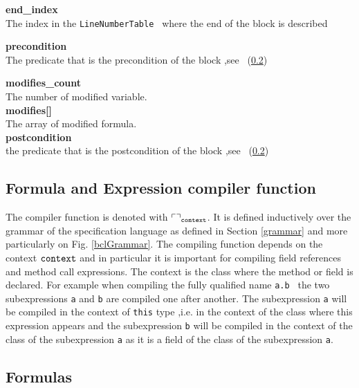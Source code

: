 \begin{appendix}
\textbf{end\_index} \\
   The index in the  \texttt{LineNumberTable } where the end of the block  is described

\textbf{  precondition} \\
  The predicate that is the precondition of the block ,see  ~(\ref{formula})

\textbf{   modifies\_count} \\
   The number of modified variable.\\

\textbf{   modifies[]} \\
   The array of modified formula.\\

\textbf{  postcondition} \\
  the predicate that is the postcondition of the block ,see  ~(\ref{formula})

\subsection{Formula and Expression compiler function }
The compiler function is denoted with  $ \ulcorner \urcorner_{\tt{context}}$. It is defined inductively over the grammar of the specification language as defined in Section 
\ref{grammar} and more particularly on Fig. \ref{bclGrammar}. 
The compiling function depends on the context $\tt{context}$ and in particular it is important for compiling field references and method call expressions.
 The context is the class where the method or field is declared. For example when  compiling the fully qualified name \texttt{a.b } the two subexpressions \texttt{a} and \texttt{b}
are compiled one after another. The subexpression \texttt{a} will be compiled in the context of \texttt{this} type ,i.e. in the context of the class where this expression appears and the subexpression \texttt{b} will be compiled in the context of the class of the subexpression \texttt{a} as it is a field of the class of the
 subexpression \texttt{a}.  

\subsection{Formulas} \label{formula}


\end{appendix}
